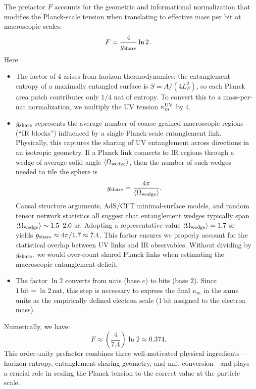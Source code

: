 \documentclass[11pt]{article}
\begin{document}
The prefactor $F$ accounts for the geometric and informational normalization that modifies the Planck-scale tension when translating to effective mass per bit at macroscopic scales:
$$ F = \frac{4}{g_{\rm share}} \ln 2\,. $$
Here:
\begin{itemize}
    \item The factor of $4$ arises from horizon thermodynamics: the entanglement entropy of a maximally entangled surface is $S = A / (4 L_P^2)$, so each Planck area patch contributes only $1/4$ nat of entropy. To convert this to a mass-per-nat normalization, we multiply the UV tension $\kappa_m^{\rm UV}$ by $4$.

    \item $g_{\rm share}$ represents the average number of coarse-grained macroscopic regions (“IR blocks”) influenced by a single Planck-scale entanglement link. Physically, this captures the sharing of UV entanglement across directions in an isotropic geometry. If a Planck link connects to IR regions through a wedge of average solid angle $\langle \Omega_{\rm wedge} \rangle$, then the number of such wedges needed to tile the sphere is
    $$ g_{\rm share} = \frac{4\pi}{\langle \Omega_{\rm wedge} \rangle}. $$
    Causal structure arguments, AdS/CFT minimal-surface models, and random tensor network statistics all suggest that entanglement wedges typically span $\langle \Omega_{\rm wedge} \rangle \sim 1.5\text{–}2.0$ sr. Adopting a representative value $\langle \Omega_{\rm wedge} \rangle = 1.7$ sr yields $g_{\rm share} \approx 4\pi / 1.7 \approx 7.4$. This factor ensures we properly account for the statistical overlap between UV links and IR observables. Without dividing by $g_{\rm share}$, we would over-count shared Planck links when estimating the macroscopic entanglement deficit.

    \item The factor $\ln 2$ converts from nats (base $e$) to bits (base $2$). Since $1\,\mathrm{bit} = \ln 2\,\mathrm{nat}$, this step is necessary to express the final $\kappa_m$ in the same units as the empirically defined electron scale ($1\,\mathrm{bit}$ assigned to the electron mass).
\end{itemize}

Numerically, we have:
$$ F \approx \left(\frac{4}{7.4}\right)\ln 2 \approx 0.374. $$
This order-unity prefactor combines three well-motivated physical ingredients—horizon entropy, entanglement sharing geometry, and unit conversion—and plays a crucial role in scaling the Planck tension to the correct value at the particle scale.
\end{document}

